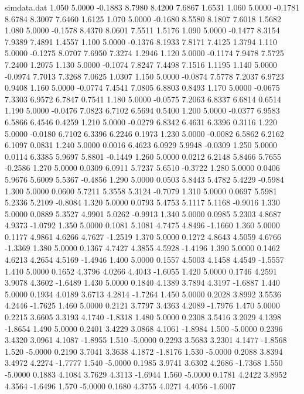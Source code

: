 \begin{filecontents*}{simdata.dat}
1.050 5.0000 -0.1883 8.7980 8.4200 7.6867 1.6531
1.060 5.0000 -0.1781 8.6784 8.3007 7.6460 1.6125
1.070 5.0000 -0.1680 8.5580 8.1807 7.6018 1.5682
1.080 5.0000 -0.1578 8.4370 8.0601 7.5511 1.5176
1.090 5.0000 -0.1477 8.3154 7.9389 7.4891 1.4557
1.100 5.0000 -0.1376 8.1933 7.8171 7.4125 1.3794
1.110 5.0000 -0.1275 8.0707 7.6950 7.3274 1.2946
1.120 5.0000 -0.1174 7.9478 7.5725 7.2400 1.2075
1.130 5.0000 -0.1074 7.8247 7.4498 7.1516 1.1195
1.140 5.0000 -0.0974 7.7013 7.3268 7.0625 1.0307
1.150 5.0000 -0.0874 7.5778 7.2037 6.9723 0.9408
1.160 5.0000 -0.0774 7.4541 7.0805 6.8803 0.8493
1.170 5.0000 -0.0675 7.3303 6.9572 6.7847 0.7541
1.180 5.0000 -0.0575 7.2063 6.8337 6.6814 0.6514
1.190 5.0000 -0.0476 7.0823 6.7102 6.5694 0.5400
1.200 5.0000 -0.0377 6.9583 6.5866 6.4546 0.4259
1.210 5.0000 -0.0279 6.8342 6.4631 6.3396 0.3116
1.220 5.0000 -0.0180 6.7102 6.3396 6.2246 0.1973
1.230 5.0000 -0.0082 6.5862 6.2162 6.1097 0.0831
1.240 5.0000 0.0016 6.4623 6.0929 5.9948 -0.0309
1.250 5.0000 0.0114 6.3385 5.9697 5.8801 -0.1449
1.260 5.0000 0.0212 6.2148 5.8466 5.7655 -0.2586
1.270 5.0000 0.0309 6.0911 5.7237 5.6510 -0.3722
1.280 5.0000 0.0406 5.9676 5.6009 5.5367 -0.4856
1.290 5.0000 0.0503 5.8443 5.4782 5.4229 -0.5984
1.300 5.0000 0.0600 5.7211 5.3558 5.3124 -0.7079
1.310 5.0000 0.0697 5.5981 5.2336 5.2109 -0.8084
1.320 5.0000 0.0793 5.4753 5.1117 5.1168 -0.9016
1.330 5.0000 0.0889 5.3527 4.9901 5.0262 -0.9913
1.340 5.0000 0.0985 5.2303 4.8687 4.9373 -1.0792
1.350 5.0000 0.1081 5.1081 4.7475 4.8496 -1.1660
1.360 5.0000 0.1177 4.9861 4.6266 4.7627 -1.2519
1.370 5.0000 0.1272 4.8643 4.5059 4.6766 -1.3369
1.380 5.0000 0.1367 4.7427 4.3855 4.5928 -1.4196
1.390 5.0000 0.1462 4.6213 4.2654 4.5169 -1.4946
1.400 5.0000 0.1557 4.5003 4.1458 4.4549 -1.5557
1.410 5.0000 0.1652 4.3796 4.0266 4.4043 -1.6055
1.420 5.0000 0.1746 4.2591 3.9078 4.3602 -1.6489
1.430 5.0000 0.1840 4.1389 3.7894 4.3197 -1.6887
1.440 5.0000 0.1934 4.0189 3.6713 4.2814 -1.7264
1.450 5.0000 0.2028 3.8992 3.5536 4.2446 -1.7625
1.460 5.0000 0.2121 3.7797 3.4363 4.2089 -1.7976
1.470 5.0000 0.2215 3.6605 3.3193 4.1740 -1.8318
1.480 5.0000 0.2308 3.5416 3.2029 4.1398 -1.8654
1.490 5.0000 0.2401 3.4229 3.0868 4.1061 -1.8984
1.500 -5.0000 0.2396 3.4320 3.0961 4.1087 -1.8955
1.510 -5.0000 0.2293 3.5683 3.2301 4.1477 -1.8568
1.520 -5.0000 0.2190 3.7041 3.3638 4.1872 -1.8176
1.530 -5.0000 0.2088 3.8394 3.4972 4.2274 -1.7777
1.540 -5.0000 0.1985 3.9741 3.6302 4.2686 -1.7368
1.550 -5.0000 0.1883 4.1084 3.7629 4.3113 -1.6944
1.560 -5.0000 0.1781 4.2422 3.8952 4.3564 -1.6496
1.570 -5.0000 0.1680 4.3755 4.0271 4.4056 -1.6007

\end{filecontents*}
